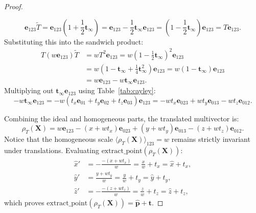 \documentclass[10pt]{article}
\begin{document}
\begin{proof}
\begin{itemize}
\begin{equation}
        \mathbf{e}_{123} \widetilde{T} = \mathbf{e}_{123} \left(1 + \frac{1}{2}\mathbf{t}_\infty\right) = \mathbf{e}_{123} - \frac{1}{2}\mathbf{t}_\infty \mathbf{e}_{123} = \left(1 - \frac{1}{2}\mathbf{t}_\infty\right) \mathbf{e}_{123} = T \mathbf{e}_{123}.
    \end{equation}
    Substituting this into the sandwich product:
    \begin{align}
        T (w \mathbf{e}_{123}) \widetilde{T} 
        &= w T^2 \mathbf{e}_{123} = w \left(1 - \frac{1}{2}\mathbf{t}_\infty\right)^2 \mathbf{e}_{123} \nonumber \\
        &= w \left(1 - \mathbf{t}_\infty + \frac{1}{4}\mathbf{t}_\infty^2\right) \mathbf{e}_{123} = w (1 - \mathbf{t}_\infty) \mathbf{e}_{123} \nonumber \\
        &= w \mathbf{e}_{123} - w \mathbf{t}_\infty \mathbf{e}_{123}.
    \end{align}
    Multiplying out $\mathbf{t}_\infty \mathbf{e}_{123}$ using Table~\ref{tab:cayley}:
    \begin{equation}
        -w \mathbf{t}_\infty \mathbf{e}_{123} = -w(t_x \mathbf{e}_{01} + t_y \mathbf{e}_{02} + t_z \mathbf{e}_{03})\mathbf{e}_{123} = -w t_x \mathbf{e}_{023} + w t_y \mathbf{e}_{013} - w t_z \mathbf{e}_{012}.
    \end{equation}
\end{itemize}
Combining the ideal and homogeneous parts, the translated multivector is:
\begin{equation}
    \rho_T(\mathbf{X}) = w \mathbf{e}_{123} - (x + w t_x)\mathbf{e}_{023} + (y + w t_y)\mathbf{e}_{013} - (z + w t_z)\mathbf{e}_{012}.
\end{equation}
Notice that the homogeneous scale $\langle \rho_T(\mathbf{X}) \rangle_{123} = w$ remains strictly invariant under translations. Evaluating $\mathrm{extract\_point}(\rho_T(\mathbf{X}))$:
\begin{align}
    \hat{x}' &= -\frac{-(x + w t_x)}{w} = \frac{x}{w} + t_x = \hat{x} + t_x, \nonumber \\
    \hat{y}' &= \frac{y + w t_y}{w} = \frac{y}{w} + t_y = \hat{y} + t_y, \nonumber \\
    \hat{z}' &= -\frac{-(z + w t_z)}{w} = \frac{z}{w} + t_z = \hat{z} + t_z,
\end{align}
which proves $\mathrm{extract\_point}(\rho_T(\mathbf{X})) = \hat{\mathbf{p}} + \mathbf{t}$.


\end{proof}
\end{document}
